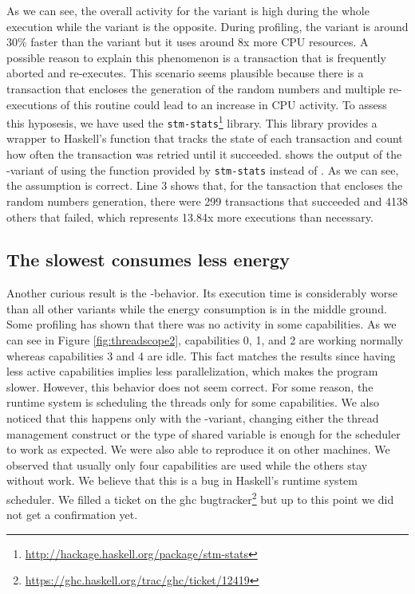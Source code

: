 As we can see, the overall activity for the \TVar variant is high during the whole execution while the \MVar variant is the opposite. During profiling, the \TVar variant is around 30\% faster than the \MVar variant but it uses around 8x more CPU resources. A possible reason to explain this phenomenon is a transaction that is frequently aborted and re-executes. This scenario seems plausible because there is a transaction that encloses the generation of the random numbers and multiple re-executions of this routine could lead to an increase in CPU activity. To assess this hyposesis, we have used the \texttt{stm-stats}\footnote{\url{http://hackage.haskell.org/package/stm-stats}} library. This library provides a wrapper to Haskell's \atomically function that tracks the state of each transaction and count how often the transaction was retried until it succeeded.  shows the output of the \forkIO-\TVar variant of \fasta using the function provided by \texttt{stm-stats} instead of \atomically. As we can see, the assumption is correct. Line 3 shows that, for the tansaction that encloses the random numbers generation, there were 299 transactions that succeeded and 4138 others that failed, which represents 13.84x more executions than necessary.

\subsection{The slowest consumes less energy}
Another curious result is the \forkOS-\MVar behavior. Its execution time is considerably worse than all other variants while the energy consumption is in the middle ground. Some profiling has shown that there was no activity in some capabilities. As we can see in Figure \ref{fig:threadscope2}, capabilities 0, 1, and 2 are working normally whereas capabilities 3 and 4 are idle. This fact matches the results since having less active capabilities implies less parallelization, which makes the program slower. However, this behavior does not seem correct. For some reason, the runtime system is scheduling the threads only for some capabilities. We also noticed that this happens only with the \forkOS-\MVar variant, changing either the thread management construct or the type of shared variable is enough for the scheduler to work as expected. We were also able to reproduce it on other machines. We observed that usually only four capabilities are used while the others stay without work. We believe that this is a bug in Haskell's runtime system scheduler. We filled a ticket on the \ac{ghc} bugtracker\footnote{\url{https://ghc.haskell.org/trac/ghc/ticket/12419}} but up to this point we did not get a confirmation yet.

